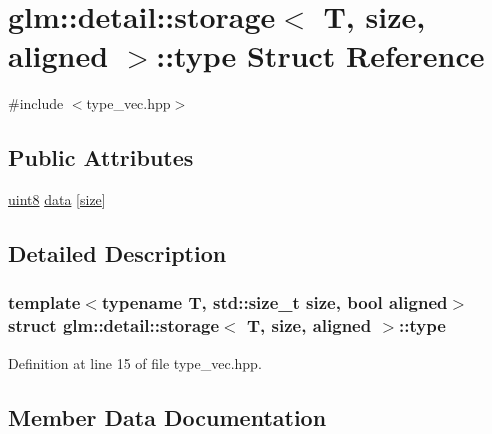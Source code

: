 \hypertarget{structglm_1_1detail_1_1storage_1_1type}{}\section{glm\+::detail\+::storage$<$ T, size, aligned $>$\+::type Struct Reference}
\label{structglm_1_1detail_1_1storage_1_1type}


{\ttfamily \#include $<$type\+\_\+vec.\+hpp$>$}

\subsection*{Public Attributes}
\begin{DoxyCompactItemize}
\item 
\mbox{\hyperlink{namespaceglm_1_1detail_aef2588f97d090cc19fbbe0c74fe17c8f}{uint8}} \mbox{\hyperlink{structglm_1_1detail_1_1storage_1_1type_ab44756dae5eb9194e4e941c91ce9f257}{data}} \mbox{[}\mbox{\hyperlink{glad_8h_a79ef9eb3e59c4bb34c4b9fbeb8d28ff7}{size}}\mbox{]}
\end{DoxyCompactItemize}


\subsection{Detailed Description}
\subsubsection*{template$<$typename T, std\+::size\+\_\+t size, bool aligned$>$\newline
struct glm\+::detail\+::storage$<$ T, size, aligned $>$\+::type}



Definition at line 15 of file type\+\_\+vec.\+hpp.



\subsection{Member Data Documentation}
\mbox{\label{structglm_1_1detail_1_1storage_1_1type_ab44756dae5eb9194e4e941c91ce9f257}} 
